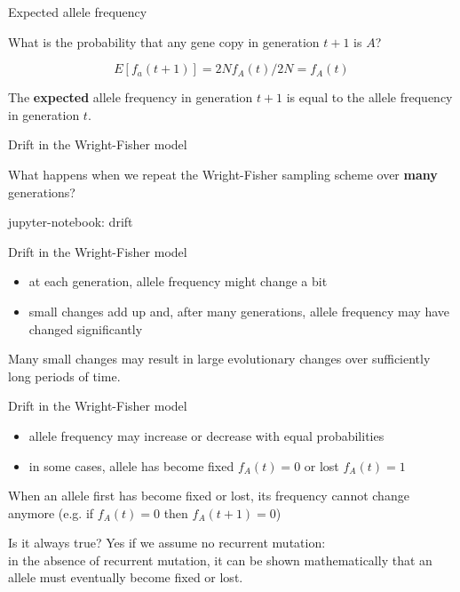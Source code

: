 \begin{frame}{Expected allele frequency}

	What is the probability that any gene copy in generation $t+1$ is $A$?

	\begin{equation}
		E[f_a(t+1)] = 2Nf_A(t) / 2N = f_A(t)
	\end{equation}

	\begin{block}{}
		The \textbf{expected} allele frequency in generation $t+1$ is equal to the allele frequency in generation $t$.
	\end{block}


\end{frame}


\begin{frame}{Drift in the Wright-Fisher model}

	What happens when we repeat the Wright-Fisher sampling scheme over \textbf{many} generations?

	\bigskip
	\tiny{jupyter-notebook: drift}

\end{frame}


\begin{frame}{Drift in the Wright-Fisher model}

	\begin{itemize}
		\item at each generation, allele frequency might change a bit
		\item small changes add up and, after many generations, allele frequency may have changed significantly
	\end{itemize}

	\begin{block}{}
		Many small changes may result in large evolutionary changes over sufficiently long periods of time.
	\end{block}

\end{frame}


\begin{frame}{Drift in the Wright-Fisher model}

	\begin{itemize}
		\item allele frequency may increase or decrease with equal probabilities
		\item in some cases, allele has become fixed $f_A(t)=0$ or lost $f_A(t)=1$
	\end{itemize}

	\begin{block}{}
		When an allele first has become fixed or lost, its frequency cannot change anymore 
		(e.g. if $f_A(t)=0$ then $f_A(t+1)=0$)
	\end{block}

	Is it always true? \pause Yes if we assume no recurrent mutation: \\
	in the absence of recurrent mutation, it can be shown mathematically that an allele must eventually become fixed or lost.

\end{frame}


